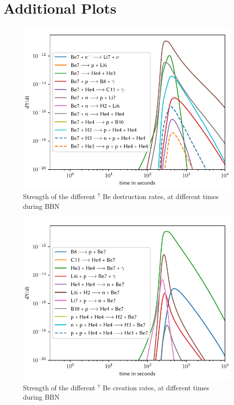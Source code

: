 \chapter{Additional Plots}
\label{chap:more_plots}

\begin{figure}[ht]
    \includegraphics[width=5.1in]{figures/app/Be7destruct.pdf}
    \caption{Strength of the different ${}^7$ Be destruction rates, at different times during BBN}
    \label{fig:Be7destruct}
\end{figure}

\begin{figure}[ht]
    \includegraphics[width=5.1in]{figures/app/Be7create.pdf}
    \caption{Strength of the different ${}^7$ Be creation rates, at different times during BBN}
    \label{fig:Be7create}
\end{figure}

